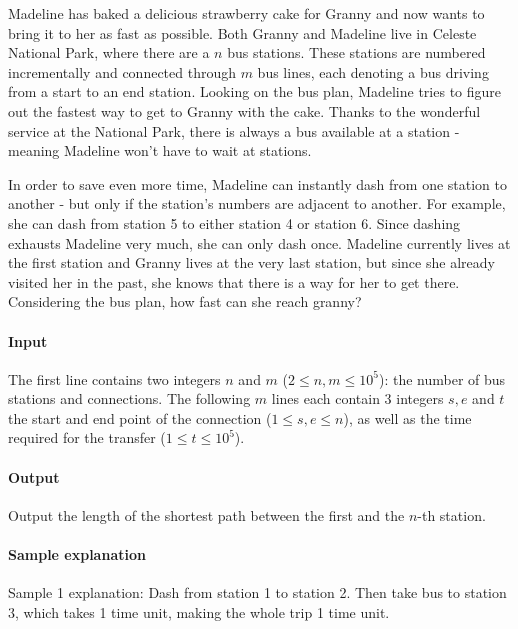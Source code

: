 



\makeheader

Madeline has baked a delicious strawberry cake for Granny and now wants to bring it to her as fast as possible.
Both Granny and Madeline live in Celeste National Park, where there are a $n$ bus stations.
These stations are numbered incrementally and connected through $m$ bus lines, each denoting a bus driving from a start to an end station.
Looking on the bus plan, Madeline tries to figure out the fastest way to get to Granny with the cake.
Thanks to the wonderful service at the National Park, there is always a bus available at a station - meaning Madeline won't have to wait at stations.


In order to save even more time, Madeline can instantly dash from one station to another - but only if the station's numbers are adjacent to another.
For example, she can dash from station 5 to either station 4 or station 6.
Since dashing exhausts Madeline very much, she can only dash once.
Madeline currently lives at the first station and Granny lives at the very last station, but since she already visited her in the past, she knows that there is a way for her to get there.
Considering the bus plan, how fast can she reach granny?

\paragraph*{Input}

The first line contains two integers $n$ and $m$ ($2 \leq n,m \leq 10^5$): the number of bus stations and connections.
The following $m$ lines each contain 3 integers $s,e$ and $t$ the start and end point of the connection ($1 \leq s,e \leq n$), as well as the time required for the transfer ($1 \leq t \leq 10^5$).

\paragraph*{Output}

Output the length of the shortest path between the first and the $n$-th station.

\begin{samples}
\end{samples}

\paragraph*{Sample explanation}

Sample 1 explanation: Dash from station 1 to station 2. Then take bus to station 3, which takes 1 time unit, making the whole trip 1 time unit.

